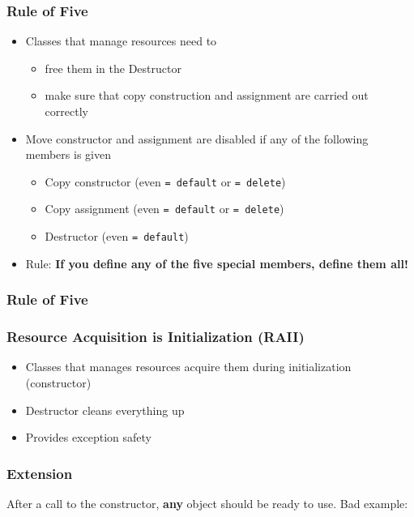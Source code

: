 \documentclass[usenames,dvipsnames,svgnames,table,aspectratio=169]{beamer}
\begin{document}
\begin{frame}
    \frametitle{Rule of Five}
    \begin{itemize}
        \item<+-> Classes that manage resources need to
        \begin{itemize}
            \item<+-> free them in the Destructor
            \item<+-> make sure that copy construction and assignment are carried out correctly
        \end{itemize}
        \item<+-> Move constructor and assignment are disabled if any of the following members is given
        \begin{itemize}
            \item<+-> Copy constructor (even \lstinline|= default| or \lstinline|= delete|)
            \item<+-> Copy assignment (even \lstinline|= default| or \lstinline|= delete|)
            \item<+-> Destructor (even \lstinline|= default|)
        \end{itemize}
        \item<+-> Rule: \textbf{If you define any of the five special members, define them all!}
    \end{itemize}
\end{frame}

\begin{frame}
    \frametitle{Rule of Five}
    
\end{frame}


\begin{frame}
    \frametitle{Resource Acquisition is Initialization (RAII)}
    \begin{itemize}
        \item<+-> Classes that manages resources acquire them during initialization (constructor)
        \item<+-> Destructor cleans everything up
        \item<+-> Provides exception safety
    \end{itemize}
    \only<+->{}
\end{frame}

\begin{frame}
    \frametitle{Extension}
    After a call to the constructor, \textbf{any} object should be ready to use. Bad example:
    \pause
    
\end{frame}
\end{document}
